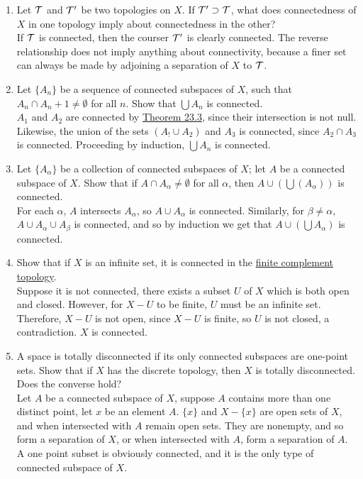 \documentclass[12pt,letterpaper]{article}
\begin{document}
\RaggedRight
\begin{enumerate}
  \item Let $\mathcal{T}$ and $\mathcal{T}'$ be two topologies on $X$. If $\mathcal{T}'\supset\mathcal{T}$, what does connectedness of $X$ in one topology imply about connectedness in the other?\\
  If $\mathcal{T}$ is connected, then the courser $\mathcal{T}'$ is clearly connected. The reverse relationship does not imply anything about connectivity, because a finer set can always be made by adjoining a separation of $X$ to $\mathcal{T}$.
  \item Let $\{A_n\}$ be a sequence of connected subspaces of $X$, such that $A_n\cap A_n+1 \neq \emptyset$ for all $n$. Show that $\bigcup A_n$ is connected. \\
  $A_1$ and $A_2$ are connected by \hyperref[thm:unionConnected]{Theorem 23.3}, since their intersection is not null. Likewise, the union of the sets $(A_!\cup A_2)$ and $A_3$ is connected, since $A_2\cap A_3$ is connected. Proceeding by induction, $\bigcup A_n$ is connected.
  \item Let $\{A_\alpha\}$ be a collection of connected subspaces of $X$; let $A$ be a connected subspace of $X$. Show that if $A\cap A_\alpha\neq\emptyset$ for all $\alpha$, then $A\cup(\bigcup(A_\alpha))$ is connected.\\
  For each $\alpha$, $A$ intersects $A_\alpha$, so $A\cup A_\alpha$ is connected. Similarly, for $\beta\neq\alpha$, $A\cup A_\alpha \cup A_\beta$ is connected, and so by induction we get that $A\cup(\bigcup A_\alpha)$ is connected.
  \item Show that if $X$ is an infinite set, it is connected in the \hyperref[dfn:finiteComplementTopology]{finite complement topology}. \\
  Suppose it is not connected, there exists a subset $U$ of $X$ which is both open and closed. However, for $X-U$ to be finite, $U$ must be an infinite set. Therefore, $X-U$ is not open, since $X-U$ is finite, so $U$ is not closed, a contradiction. $X$ is connected.
  \item A space is totally disconnected if its only connected subspaces are one-point sets. Show that if $X$ has the discrete topology, then $X$ is totally disconnected. Does the converse hold? \\
  Let $A$ be a connected subspace of $X$, suppose $A$ contains more than one distinct point, let $x$ be an element $A$. $\{x\}$ and $X-\{x\}$ are open sets of $X$, and when intersected with $A$ remain open sets. They are nonempty, and so form a separation of $X$, or when intersected with $A$, form a separation of $A$. A one point subset is obviously connected, and it is the only type of connected subspace of $X$.\\

\end{enumerate}
\end{document}
